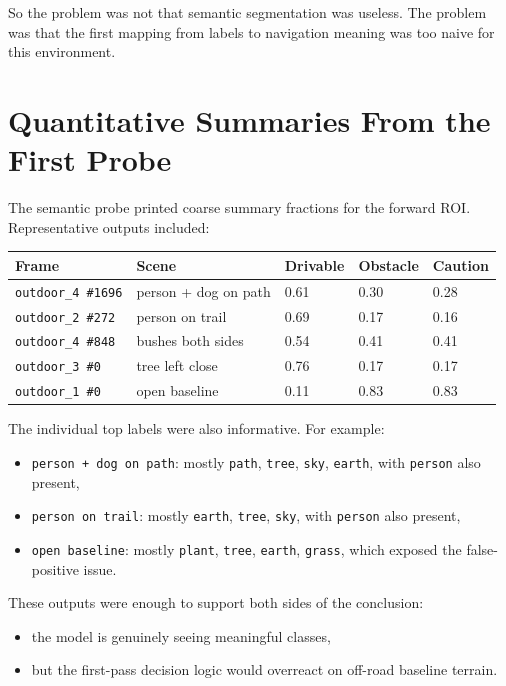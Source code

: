 \documentclass[11pt]{article}
\begin{document}
So the problem was not that semantic segmentation was useless. The problem was that the first mapping from labels to navigation meaning was too naive for this environment.

\section{Quantitative Summaries From the First Probe}
The semantic probe printed coarse summary fractions for the forward ROI. Representative outputs included:

\begin{longtable}{p{} p{} p{} p{} p{}}
\toprule
\textbf{Frame} & \textbf{Scene} & \textbf{Drivable} & \textbf{Obstacle} & \textbf{Caution} \\
\midrule
\texttt{outdoor\_4 \#1696} & person + dog on path & 0.61 & 0.30 & 0.28 \\
\texttt{outdoor\_2 \#272} & person on trail & 0.69 & 0.17 & 0.16 \\
\texttt{outdoor\_4 \#848} & bushes both sides & 0.54 & 0.41 & 0.41 \\
\texttt{outdoor\_3 \#0} & tree left close & 0.76 & 0.17 & 0.17 \\
\texttt{outdoor\_1 \#0} & open baseline & 0.11 & 0.83 & 0.83 \\
\bottomrule
\end{longtable}

The individual top labels were also informative. For example:
\begin{itemize}[leftmargin=*]
\item \texttt{person + dog on path}: mostly \texttt{path}, \texttt{tree}, \texttt{sky}, \texttt{earth}, with \texttt{person} also present,
\item \texttt{person on trail}: mostly \texttt{earth}, \texttt{tree}, \texttt{sky}, with \texttt{person} also present,
\item \texttt{open baseline}: mostly \texttt{plant}, \texttt{tree}, \texttt{earth}, \texttt{grass}, which exposed the false-positive issue.
\end{itemize}

These outputs were enough to support both sides of the conclusion:
\begin{itemize}[leftmargin=*]
\item the model is genuinely seeing meaningful classes,
\item but the first-pass decision logic would overreact on off-road baseline terrain.
\end{itemize}
\end{document}

